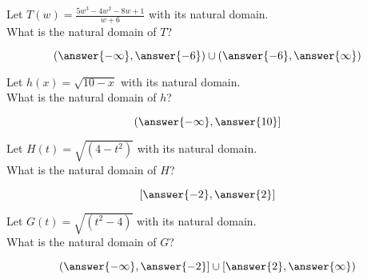 \documentclass{ximera}
\author{Lee Wayand}
\begin{document}
\begin{exercise}








\begin{question}


Let $T(w) = \frac{5 w^3 - 4 w^2 - 8w + 1}{w+6}$ with its natural domain. \\

What is the natural domain of $T$?

\[
\left( \answer{-\infty}, \answer{-6}  \right) \cup \left( \answer{-6}, \answer{\infty}  \right)
\]


\end{question}







\begin{question}


Let $h(x) = \sqrt{10-x}$ with its natural domain. \\

What is the natural domain of $h$?

\[
\left( \answer{-\infty}, \answer{10}  \right] 
\]


\end{question}








\begin{question}


Let $H(t) = \sqrt{(4 - t^2)}$ with its natural domain. \\

What is the natural domain of $H$?

\[
\left[ \answer{-2}, \answer{2}  \right]
\]


\end{question}









\begin{question}


Let $G(t) = \sqrt{(t^2 - 4)}$ with its natural domain. \\

What is the natural domain of $G$?

\[
\left( \answer{-\infty}, \answer{-2} \right] \cup   \left[  \answer{2}, \answer{\infty} \right) 
\]



\end{question}
\end{exercise}
\end{document}
